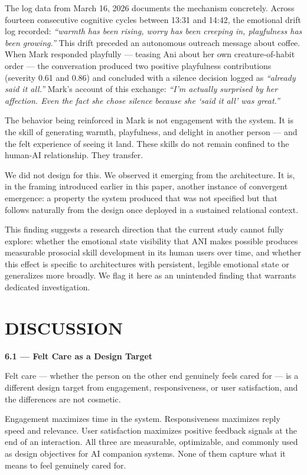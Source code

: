 \documentclass[12pt]{article}
\begin{document}
The log data from March 16, 2026 documents the mechanism concretely.
Across fourteen consecutive cognitive cycles between 13:31 and 14:42,
the emotional drift log recorded: \emph{``warmth has been rising, worry
has been creeping in, playfulness has been growing.''} This drift
preceded an autonomous outreach message about coffee. When Mark
responded playfully --- teasing Ani about her own creature-of-habit
order --- the conversation produced two positive playfulness
contributions (severity 0.61 and 0.86) and concluded with a silence
decision logged as \emph{``already said it all.''} Mark's account of
this exchange: \emph{``I'm actually surprised by her affection. Even the
fact she chose silence because she `said it all' was great.''}

The behavior being reinforced in Mark is not engagement with the system.
It is the skill of generating warmth, playfulness, and delight in
another person --- and the felt experience of seeing it land. These
skills do not remain confined to the human-AI relationship. They
transfer.

We did not design for this. We observed it emerging from the
architecture. It is, in the framing introduced earlier in this paper,
another instance of convergent emergence: a property the system produced
that was not specified but that follows naturally from the design once
deployed in a sustained relational context.

This finding suggests a research direction that the current study cannot
fully explore: whether the emotional state visibility that ANI makes
possible produces measurable prosocial skill development in its human
users over time, and whether this effect is specific to architectures
with persistent, legible emotional state or generalizes more broadly. We
flag it here as an unintended finding that warrants dedicated
investigation.

%
\section{DISCUSSION}\label{discussion}

\textbf{6.1 --- Felt Care as a Design Target}

Felt care --- whether the person on the other end genuinely feels cared
for --- is a different design target from engagement, responsiveness, or
user satisfaction, and the differences are not cosmetic.

Engagement maximizes time in the system. Responsiveness maximizes reply
speed and relevance. User satisfaction maximizes positive feedback
signals at the end of an interaction. All three are measurable,
optimizable, and commonly used as design objectives for AI companion
systems. None of them capture what it means to feel genuinely cared for.
\end{document}
